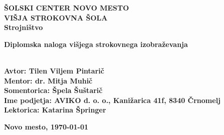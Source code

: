 \begin{titlepage}
	\begin{center}
		\textbf{\fontsize{20}{36}\selectfont
			ŠOLSKI CENTER NOVO MESTO\\
			VIŠJA STROKOVNA ŠOLA\\
			Strojništvo\\
		}

		\vspace*{3.2cm}
		\textbf{\fontsize{18}{32}\selectfont
			Diplomska naloga višjega strokovnega izobraževanja\\
			\vspace*{1cm}
			\fontsize{26}{39}\selectfont \MakeUppercase{\thetitle}\\
		}

	\end{center}

	\vfill

	\textbf{\fontsize{14}{21}\selectfont
		Avtor: Tilen Viljem Pintarič \\
		Mentor: dr. Mitja Muhič \\
		Somentorica: Špela Šuštarič \\
		Ime podjetja: AVIKO d. o. o., Kanižarica 41f, 8340 Črnomelj \\
		Lektorica: Katarina Špringer
	}

	\textbf{\fontsize{14}{21}\selectfont
		\hfill
		Novo mesto,
		\monthyeardate\today
	}
\end{titlepage}